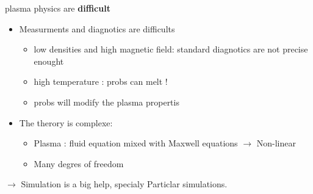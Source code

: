 \documentclass[sans, aspectratio=169]{beamer}
\begin{document}
\begin{frame}{plasma physics are \textbf{difficult}} 

	\begin{itemize}
	\item Measurments and diagnotics are difficults
		\begin{itemize}
			\item low densities and high magnetic field: standard diagnotics are not precise enought

			\item high temperature : probs can melt !
			\item probs will modify the plasma propertis
		
		\end{itemize}
	\end{itemize}
	\begin{itemize}
	\item The therory is complexe:
		\begin{itemize}
			\item Plasma : fluid equation mixed with Maxwell equations $\rightarrow$ Non-linear
			\item Many degres of freedom
		
		\end{itemize}
	\end{itemize}
	$\rightarrow$ Simulation is a big help, specialy Particlar simulations.
\end{frame}
\end{document}
